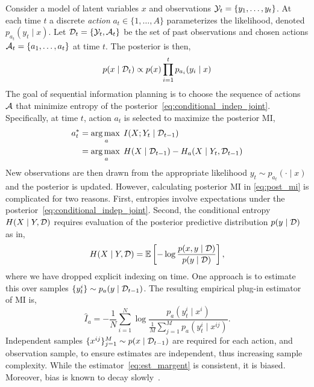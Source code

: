 Consider a model of latent variables $x$ and observations $\mathcal{Y}_{t}
= \{y_1,\ldots,y_{t}\}$.  At each time $t$ a discrete
\emph{action} $a_{t} \in \{1,\ldots,A\}$ parameterizes the
likelihood, denoted \mbox{$p_{a_{t}}(y_{t} \mid x)$}.  Let
$\mathcal{D}_{t} = \{\mathcal{Y}_{t},\mathcal{A}_{t}\}$ be the set of past observations
and chosen actions \mbox{$\mathcal{A}_{t} =
\{a_1,\ldots,a_{t}\}$} at time $t$.  The posterior is then,
\begin{equation}\label{eq:conditional_indep_joint}
  p(x\mid \mathcal{D}_{t}) \propto
    p(x) \prod_{i=1}^{t} p_{a_i}(y_i \mid x)
\end{equation}
The goal of sequential information planning is to choose the sequence
of actions $\mathcal{A}$ that minimize entropy of the
posterior~\eqref{eq:conditional_indep_joint}.  Specifically, at time
$t$, action $a_t$ is selected to maximize the posterior MI,
\begin{align}\label{eq:post_mi}
  a_t^{*} &= \operatorname*{arg\,max\;}_a I(X;Y_t \mid \mathcal{D}_{t-1}) \notag \\
          &= \operatorname*{arg\,max\;}_a H(X\mid \mathcal{D}_{t-1}) - H_a(X \mid Y_t, \mathcal{D}_{t-1})
\end{align}
New observations are then drawn from the appropriate likelihood
$y_t \sim p_{a_t}(\cdot \mid x)$ and the posterior is updated.
However, calculating posterior MI in \EQN\eqref{eq:post_mi} is
complicated for two reasons.  First, entropies involve expectations
under the posterior~\eqref{eq:conditional_indep_joint}.  Second, the
conditional entropy $H(X\mid Y, \mathcal{D})$ requires evaluation of the
posterior predictive distribution $p(y\mid \mathcal{D})$ as in,
\[
  H(X\mid Y, \mathcal{D}) = \mathbb{E}\left[
    - \log \frac{p(x,y\mid \mathcal{D})}{ p(y\mid \mathcal{D}) } \right],
\]
where we have dropped explicit indexing on time.  One approach is to
estimate this over samples \mbox{$\{y^i_t\} \sim
p_a(y\mid \mathcal{D}_{t-1})$}.  The resulting empirical plug-in estimator
of MI is,
\begin{equation}\label{eq:est_margent}
  \hat{I}_a = - \frac{1}{N} \sum_{i=1}^N \log \frac{
    p_a(y_t^i\mid x^i) }{\frac{1}{M}
        \sum_{j=1}^M p_a(y_t^i \mid x^{ij})}.
\end{equation}
Independent samples $\{x^{ij}\}_{j=1}^M \sim p(x \mid \mathcal{D}_{t-1})$
are required for each action, and observation sample, to ensure
estimates are independent, thus increasing sample complexity.  While
the estimator~\eqref{eq:est_margent} is consistent, it is biased.
Moreover, bias is known to decay slowly~\citep{zheng2018robust,
rainforth2018nesting}.

